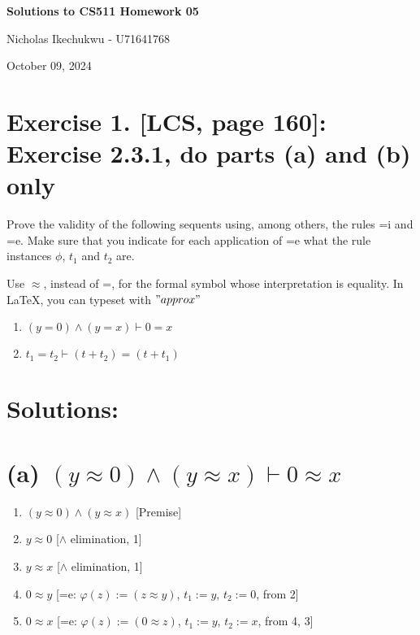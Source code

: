 \documentclass{article}
\newenvironment{proof}
{\begin{mdframed}[linewidth=0.5pt]\begin{enumerate}[label=\arabic*.,leftmargin=*]}
{\end{enumerate}\end{mdframed}}
\begin{document}
\begin{center}
    \Large\textbf{Solutions to CS511 Homework 05}
    
    \vspace{0.5cm}
    
    \large Nicholas Ikechukwu - U71641768
    
    \vspace{0.3cm}
    
    \large October 09, 2024
\end{center}



\section*{Exercise 1. [LCS, page 160]: Exercise 2.3.1, do parts (a) and (b) only }
\begin{mdframed}
    Prove the validity of the following sequents using, among others, the rules =i
    and =e. Make sure that you indicate for each application of =e what the rule
    instances $\phi$, $t_1$ and $t_2$ are.
    
    Use $\approx$, instead of =, for the formal symbol whose interpretation is equality. In LaTeX, you can typeset
    with ${"approx"}$
     
    
    \begin{enumerate}[label=(\alph*)]
    \item $(y = 0) \land (y = x) \vdash 0 = x$
    \item $t_1 = t_2 \vdash (t + t_2) = (t + t_1)$
    \end{enumerate}
\end{mdframed}

\section*{Solutions:}

\section*{(a) $(y \approx 0) \wedge (y \approx x) \vdash 0 \approx x$}

\begin{proof}
\begin{enumerate}
    \item $(y \approx 0) \wedge (y \approx x)$ \hfill [Premise]
    \item $y \approx 0$ \hfill [$\wedge$ elimination, 1]
    \item $y \approx x$ \hfill [$\wedge$ elimination, 1]
    \item $0 \approx y$ \hfill [=e: $\varphi(z) := (z \approx y)$, $t_1 := y$, $t_2 := 0$, from 2]
    \item $0 \approx x$ \hfill [=e: $\varphi(z) := (0 \approx z)$, $t_1 := y$, $t_2 := x$, from 4, 3]
\end{enumerate}
\end{proof}
\end{document}

